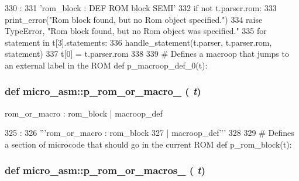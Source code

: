 \begin{DoxyCode}
330                   :
331     'rom_block : DEF ROM block SEMI'
332     if not t.parser.rom:
333         print_error("Rom block found, but no Rom object specified.")
334         raise TypeError, "Rom block found, but no Rom object was specified."
335     for statement in t[3].statements:
336         handle_statement(t.parser, t.parser.rom, statement)
337     t[0] = t.parser.rom
338 
339 # Defines a macroop that jumps to an external label in the ROM
def p_macroop_def_0(t):
\end{DoxyCode}
\hypertarget{namespacemicro__asm_a1074e10937aa3b2c8c2a43b95ecb89bc}{
\subsubsection[{p\_\-rom\_\-or\_\-macro\_\-0}]{\setlength{\rightskip}{0pt plus 5cm}def micro\_\-asm::p\_\-rom\_\-or\_\-macro\_ ( {\em t})}}
\label{namespacemicro__asm_a1074e10937aa3b2c8c2a43b95ecb89bc}
\begin{DoxyVerb}rom_or_macro : rom_block
                | macroop_def\end{DoxyVerb}
 


\begin{DoxyCode}
325                        :
326     '''rom_or_macro : rom_block
327                     | macroop_def'''
328 
329 # Defines a section of microcode that should go in the current ROM
def p_rom_block(t):
\end{DoxyCode}
\hypertarget{namespacemicro__asm_a964484247cb0adbfa617df2dc18412f9}{
\subsubsection[{p\_\-rom\_\-or\_\-macros\_\-0}]{\setlength{\rightskip}{0pt plus 5cm}def micro\_\-asm::p\_\-rom\_\-or\_\-macros\_ ( {\em t})}}
\label{namespacemicro__asm_a964484247cb0adbfa617df2dc18412f9}



